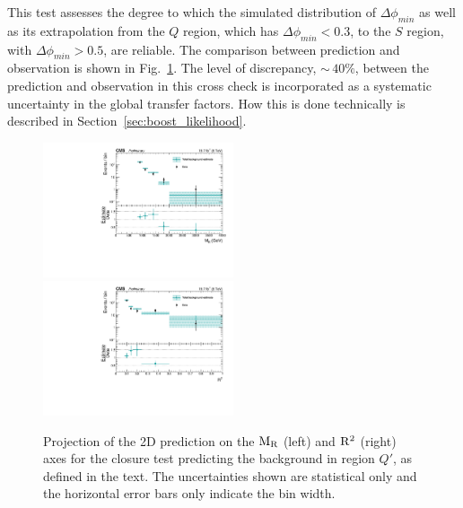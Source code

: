 This test assesses the degree to which the simulated distribution of $\Delta\phi_{min}$ as well as
its extrapolation from the $Q$ region, which has $\Delta\phi_{min} < 0.3$, to the $S$ region, with
$\Delta\phi_{min} > 0.5$, are reliable. The comparison between
prediction and observation is shown in Fig.~\ref{fig:Shape_syst_1D_project_QCD}. 
The level of discrepancy, ${\sim}\,40\%$, between the prediction and observation in this cross
check is incorporated as a systematic uncertainty in the global transfer factors. How this is done
technically is described in Section~\ref{sec:boost_likelihood}.

\begin{figure}[htpb]
\includegraphics[width=0.5\textwidth]
{figures/razor_selection/MR_comparison_data_estimate_0Lbg1uW0Ll_mdPhig0p5_from_0Lbg1uW0Ll_mdPhi0p3_log}
\includegraphics[width=0.5\textwidth]
{figures/razor_selection/R2_comparison_data_estimate_0Lbg1uW0Ll_mdPhig0p5_from_0Lbg1uW0Ll_mdPhi0p3_log}
\caption{Projection of the 2D prediction on the $\mathrm{M_R}$ (left) and $\mathrm{R^2}$ (right) axes for the closure
test predicting the background in region $Q'$, as defined in the text. The uncertainties shown are
statistical only and the horizontal error bars only indicate the bin width.
\label{fig:Shape_syst_1D_project_QCD}}
\end{figure}
